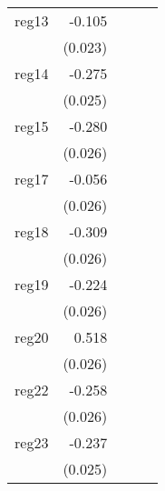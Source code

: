 {\begin{longtable}{l*{4}{D{.}{.}{-1}}}
\addlinespace
reg13       &      -0.105\sym{***}&                     &                     &                     \\
            &     (0.023)         &                     &                     &                     \\
\addlinespace
reg14       &      -0.275\sym{***}&                     &                     &                     \\
            &     (0.025)         &                     &                     &                     \\
\addlinespace
reg15       &      -0.280\sym{***}&                     &                     &                     \\
            &     (0.026)         &                     &                     &                     \\
\addlinespace
reg17       &      -0.056\sym{*}  &                     &                     &                     \\
            &     (0.026)         &                     &                     &                     \\
\addlinespace
reg18       &      -0.309\sym{***}&                     &                     &                     \\
            &     (0.026)         &                     &                     &                     \\
\addlinespace
reg19       &      -0.224\sym{***}&                     &                     &                     \\
            &     (0.026)         &                     &                     &                     \\
\addlinespace
reg20       &       0.518\sym{***}&                     &                     &                     \\
            &     (0.026)         &                     &                     &                     \\
\addlinespace
reg22       &      -0.258\sym{***}&                     &                     &                     \\
            &     (0.026)         &                     &                     &                     \\
\addlinespace
reg23       &      -0.237\sym{***}&                     &                     &                     \\
            &     (0.025)         &                     &                     &                     \\

\end{longtable}}
